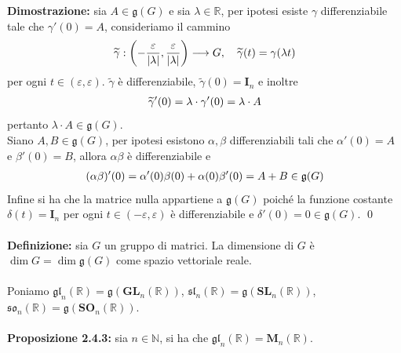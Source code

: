 \documentclass{article}
\begin{document}
\textbf{Dimostrazione:} sia $A \in \mathfrak{g}(G)$ e sia $\lambda \in \mathbb{R}$, per ipotesi esiste $\gamma$ differenziabile tale che $\gamma'(0) = A$, consideriamo il cammino
\begin{gather}
    \widetilde{\gamma} : \left( -\frac{\varepsilon}{|\lambda|}, \frac{\varepsilon}{|\lambda|} \right) \longrightarrow G, \quad \widetilde{\gamma}(t) = \gamma(\lambda t) \notag
\end{gather}
per ogni $t \in (\varepsilon, \varepsilon)$. $\widetilde{\gamma}$ è differenziabile, $\widetilde{\gamma}(0) = \mathbf{I}_n$ e inoltre
\begin{gather}
    \widetilde{\gamma}'(0) = \lambda \cdot \gamma'(0) = \lambda \cdot A \notag
\end{gather}
pertanto $\lambda \cdot A \in \mathfrak{g}(G)$. \\
Siano $A, B \in \mathfrak{g}(G)$, per ipotesi esistono $\alpha, \beta$ differenziabili tali che $\alpha'(0) = A$ e $\beta'(0) = B$, allora $\alpha\beta$ è differenziabile e
\begin{gather}
    (\alpha\beta)'(0) = \alpha'(0)\beta(0) + \alpha(0)\beta'(0) = A + B \in \mathfrak{g}(G) \notag
\end{gather}
Infine si ha che la matrice nulla appartiene a $\mathfrak{g}(G)$ poiché la funzione costante $\delta(t) = \mathbf{I}_n$ per ogni $t \in (-\varepsilon, \varepsilon)$ è differenziabile e $\delta'(0) = 0 \in \mathfrak{g}(G)$. \qed \\ \\
\textbf{Definizione:} sia $G$ un gruppo di matrici. La dimensione di $G$ è $\dim G = \dim \mathfrak{g}(G)$ come spazio vettoriale reale. \\ \\
Poniamo $\mathfrak{gl}_n(\mathbb{R}) = \mathfrak{g}(\mathbf{GL}_n(\mathbb{R}))$, $\mathfrak{sl}_n(\mathbb{R}) = \mathfrak{g}(\mathbf{SL}_n(\mathbb{R}))$, $\mathfrak{so}_n(\mathbb{R}) = \mathfrak{g}(\mathbf{SO}_n(\mathbb{R}))$. \\ \\
\textbf{Proposizione 2.4.3:} sia $n \in \mathbb{N}$, si ha che $\mathfrak{gl}_n(\mathbb{R}) = \mathbf{M}_n(\mathbb{R})$. \\
\end{document}
